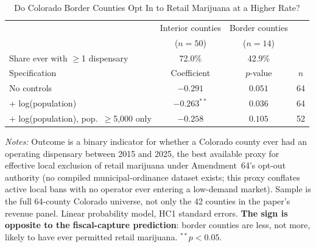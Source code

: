 \begin{table}[htbp]
\centering
\caption{Do Colorado Border Counties Opt In to Retail Marijuana at a Higher Rate?}
\label{tab:politicaleconomy}
\small
\begin{tabular}{lccc}
\toprule
& Interior counties & Border counties & \\
& ($n=50$) & ($n=14$) & \\
\midrule
Share ever with $\geq$1 dispensary & 72.0\% & 42.9\% & \\
\midrule
Specification & Coefficient & $p$-value & $n$ \\
\midrule
No controls & $-0.291$ & $0.051$ & 64 \\
+ log(population) & $-0.263^{**}$ & $0.036$ & 64 \\
+ log(population), pop.\ $\geq$5{,}000 only & $-0.258$ & $0.105$ & 52 \\
\bottomrule
\end{tabular}
\begin{minipage}{0.95\textwidth}
\vspace{0.3em}
\footnotesize
\textit{Notes:} Outcome is a binary indicator for whether a Colorado county ever had an operating
dispensary between 2015 and 2025, the best available proxy for effective local exclusion of retail
marijuana under Amendment~64's opt-out authority (no compiled municipal-ordinance dataset exists; this
proxy conflates active local bans with no operator ever entering a low-demand market). Sample is the full
64-county Colorado universe, not only the 42 counties in the paper's revenue panel. Linear probability
model, HC1 standard errors. \textbf{The sign is opposite to the fiscal-capture prediction}: border
counties are less, not more, likely to have ever permitted retail marijuana. $^{**}p<0.05$.
\end{minipage}
\end{table}
